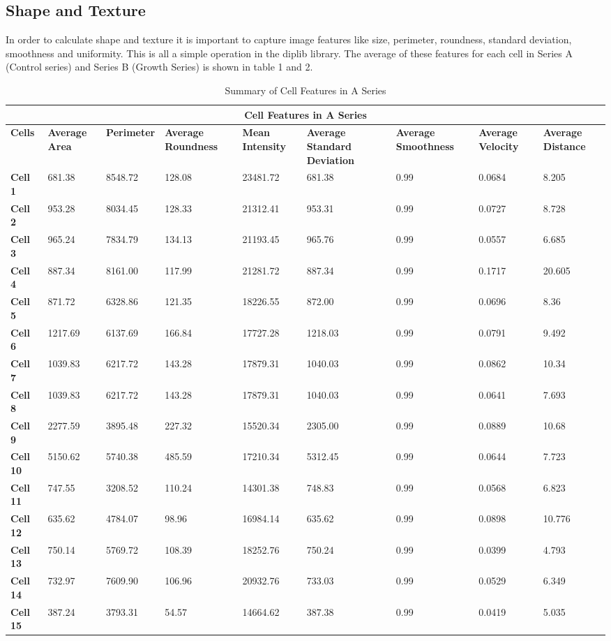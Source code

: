 \documentclass{article}
\begin{document}
\subsection*{Shape and Texture}
In order to calculate shape and texture it is important to capture image features like size, perimeter, roundness, standard deviation, smoothness and uniformity. This is all a simple operation in the diplib library. The average of these features for each cell in Series A (Control series) and Series B (Growth Series) is shown in table 1 and 2.

\begin{table}[h!]
\centering
\caption{Summary of Cell Features in A Series}
\begin{tabular}{|p{1.2cm}|p{1.5cm}|p{1.5cm}|p{1.5cm}|p{1.7cm}|p{1.5cm}|p{1.7cm}|p{1.5cm}|p{1.7cm}|}
\hline
\multicolumn{9}{|c|}{\textbf{Cell Features in A Series}} \\
\hline
\textbf{Cells} & \textbf{Average Area} & \textbf{Perimeter} & \textbf{Average Roundness} & \textbf{Mean Intensity} & \textbf{Average Standard Deviation} & \textbf{Average Smoothness} & \textbf{Average Velocity} & \textbf{Average Distance} \\
\hline
\textbf{Cell 1} & 681.38 & 8548.72 & 128.08 & 23481.72 & 681.38 & 0.99 & 0.0684 & 8.205 \\
\textbf{Cell 2} & 953.28 & 8034.45 & 128.33 & 21312.41 & 953.31 & 0.99 & 0.0727 & 8.728 \\
\textbf{Cell 3} & 965.24 & 7834.79 & 134.13 & 21193.45 & 965.76 & 0.99 & 0.0557 & 6.685 \\
\textbf{Cell 4} & 887.34 & 8161.00 & 117.99 & 21281.72 & 887.34 & 0.99 & 0.1717 & 20.605 \\
\textbf{Cell 5} & 871.72 & 6328.86 & 121.35 & 18226.55 & 872.00 & 0.99 & 0.0696 & 8.36 \\
\textbf{Cell 6} & 1217.69 & 6137.69 & 166.84 & 17727.28 & 1218.03 & 0.99 & 0.0791 & 9.492 \\
\textbf{Cell 7} & 1039.83 & 6217.72 & 143.28 & 17879.31 & 1040.03 & 0.99 & 0.0862 & 10.34 \\
\textbf{Cell 8} & 1039.83 & 6217.72 & 143.28 & 17879.31 & 1040.03 & 0.99 & 0.0641 & 7.693 \\
\textbf{Cell 9} & 2277.59 & 3895.48 & 227.32 & 15520.34 & 2305.00 & 0.99 & 0.0889 & 10.68 \\
\textbf{Cell 10} & 5150.62 & 5740.38 & 485.59 & 17210.34 & 5312.45 & 0.99 & 0.0644 & 7.723 \\
\textbf{Cell 11} & 747.55 & 3208.52 & 110.24 & 14301.38 & 748.83 & 0.99 & 0.0568 & 6.823 \\
\textbf{Cell 12} & 635.62 & 4784.07 & 98.96 & 16984.14 & 635.62 & 0.99 & 0.0898 & 10.776 \\
\textbf{Cell 13} & 750.14 & 5769.72 & 108.39 & 18252.76 & 750.24 & 0.99 & 0.0399 & 4.793 \\
\textbf{Cell 14} & 732.97 & 7609.90 & 106.96 & 20932.76 & 733.03 & 0.99 & 0.0529 & 6.349 \\
\textbf{Cell 15} & 387.24 & 3793.31 & 54.57 & 14664.62 & 387.38 & 0.99 & 0.0419 & 5.035 \\
\hline
\end{tabular}
\end{table}
\end{document}
